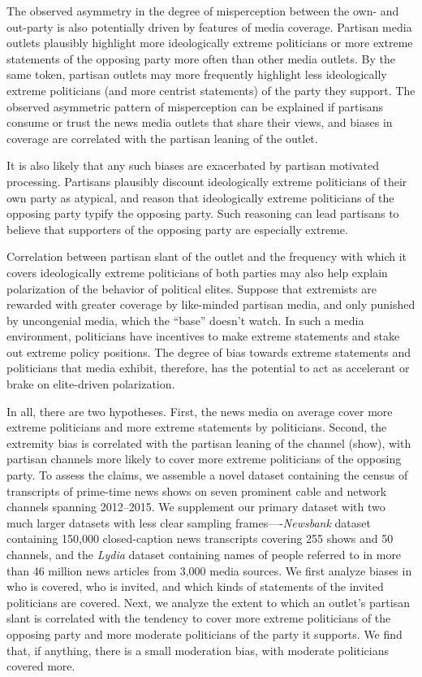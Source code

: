 \documentclass[12pt, letterpaper]{article}
\begin{document}
The observed asymmetry in the degree of misperception between the own- and out-party is also potentially driven by features of media coverage. Partisan media outlets plausibly highlight more ideologically extreme politicians or more extreme statements of the opposing party more often than other media outlets. By the same token, partisan outlets may more frequently highlight less ideologically extreme politicians (and more centrist statements) of the party they support. The observed asymmetric pattern of misperception can be explained if partisans consume or trust the news media outlets that share their views, and biases in coverage are correlated with the partisan leaning of the outlet.

It is also likely that any such biases are exacerbated by partisan motivated processing. Partisans plausibly discount ideologically extreme politicians of their own party as atypical, and reason that ideologically extreme politicians of the opposing party typify the opposing party. Such reasoning can lead partisans to believe that supporters of the opposing party are especially extreme.

Correlation between partisan slant of the outlet and the frequency with which it covers ideologically extreme politicians of both parties may also help explain polarization of the behavior of political elites. Suppose that extremists are rewarded with greater coverage by like-minded partisan media, and only punished by uncongenial media, which the ``base'' doesn't watch. In such a media environment, politicians have incentives to make extreme statements and stake out extreme policy positions. The degree of bias towards extreme statements and politicians that media exhibit, therefore, has the potential to act as accelerant or brake on elite-driven polarization.

In all, there are two hypotheses. First, the news media on average cover more extreme politicians and more extreme statements by politicians. Second, the extremity bias is correlated with the partisan leaning of the channel (show), with partisan channels more likely to cover more extreme politicians of the opposing party.  To assess the claims, we assemble a novel dataset containing the census of transcripts of prime-time news shows on seven prominent cable and network channels spanning 2012--2015. We supplement our primary dataset with two much larger datasets with less clear sampling frames----\textit{Newsbank} dataset containing 150,000 closed-caption news transcripts covering 255 shows and 50 channels, and the \textit{Lydia} dataset containing names of people referred to in more than 46 million news articles from 3,000 media sources. We first analyze biases in who is covered, who is invited, and which kinds of statements of the invited politicians are covered. Next, we analyze the extent to which an outlet's partisan slant is correlated with the tendency to cover more extreme politicians of the opposing party and more moderate politicians of the party it supports. We find that, if anything, there is a small moderation bias, with moderate politicians covered more.
\end{document}
